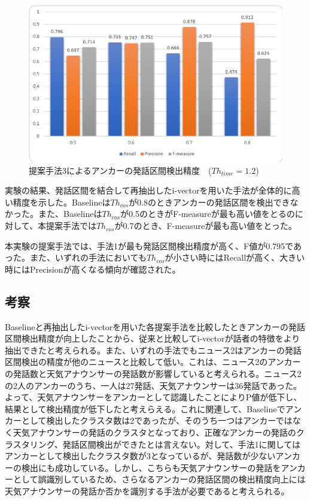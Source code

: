\begin{figure}[H]
  \begin{center}
    \includegraphics[scale=0.8]{./figure/get_anchor_prob3.eps}
  \end{center}
  \caption{提案手法3によるアンカーの発話区間検出精度　($Th_{time}=1.2$) \label{fig:result_anchor_prob3}}
\end{figure}

実験の結果、発話区間を結合して再抽出したi-vectorを用いた手法が全体的に高い精度を示した。Baselineは$Th_{cos}$が0.8のときアンカーの発話区間を検出できなかった。また、Baselineは$Th_{cos}$が0.5のときがF-measureが最も高い値をとるのに対して、本提案手法では$Th_{cos}$が0.7のとき、F-measureが最も高い値をとった。\par
本実験の提案手法では、手法1が最も発話区間検出精度が高く、F値が0.795であった。また、いずれの手法においても$Th_{cos}$が小さい時にはRecallが高く、大きい時にはPrecisionが高くなる傾向が確認された。

\subsection{考察}
Baselineと再抽出したi-vectorを用いた各提案手法を比較したときアンカーの発話区間検出精度が向上したことから、従来と比較してi-vectorが話者の特徴をより抽出できたと考えられる。また、いずれの手法でもニュース2はアンカーの発話区間検出の精度が他のニュースと比較して低い。これは、ニュース2のアンカーの発話数と天気アナウンサーの発話数が影響していると考えられる。ニュース2の2人のアンカーのうち、一人は27発話、天気アナウンサーは36発話であった。よって、天気アナウンサーをアンカーとして認識したことによりP値が低下し、結果として検出精度が低下したと考えらえる。これに関連して、Baselineでアンカーとして検出したクラスタ数は2であったが、そのうち一つはアンカーではなく天気アナウンサーの発話のクラスタとなっており、正確なアンカーの発話のクラスタリング、発話区間検出ができたとは言えない。対して、手法1に関してはアンカーとして検出したクラスタ数が3となっているが、発話数が少ないアンカーの検出にも成功している。しかし、こちらも天気アナウンサーの発話をアンカーとして誤識別しているため、さらなるアンカーの発話区間の検出精度向上には天気アナウンサーの発話か否かを識別する手法が必要であると考えられる。